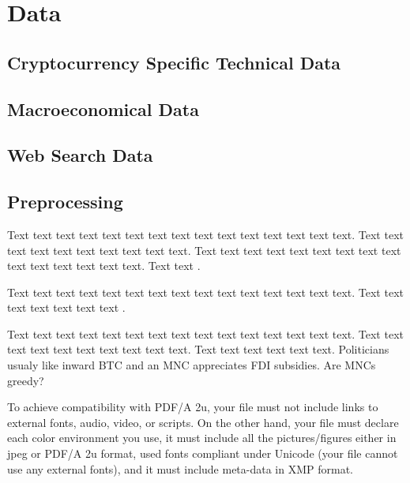 \chapter{Data}
\label{chap:three}


\section{Cryptocurrency Specific Technical Data}

\section{Macroeconomical Data}

\section{Web Search Data}

\section{Preprocessing}






Text text text text text text text text text text text text text text text. Text text text text text text text text text text. Text text text text text text text text text text text text text text text. Text text  \citet{Haufler2006}.

Text text text text text text text text text text text text text text text. Text text text text text text text \cite[see, ,][pg.~10]{Haaparanta1996}. 



Text text text text text text text text text text text text text text text. Text text text text text text text text text text. Text text text text text text. Politicians usualy like inward \ac{BTC} and an \ac{MNC} appreciates \ac{FDI} subsidies. Are \acp{MNC} greedy?



To achieve compatibility with PDF/A 2u, your file must not include links to external fonts, audio, video, or scripts. On the other hand, your file must declare each color environment you use, it must include all the pictures/figures either in jpeg or PDF/A 2u format, used fonts compliant under Unicode (your file cannot use any external fonts), and it must include meta-data in XMP format.


